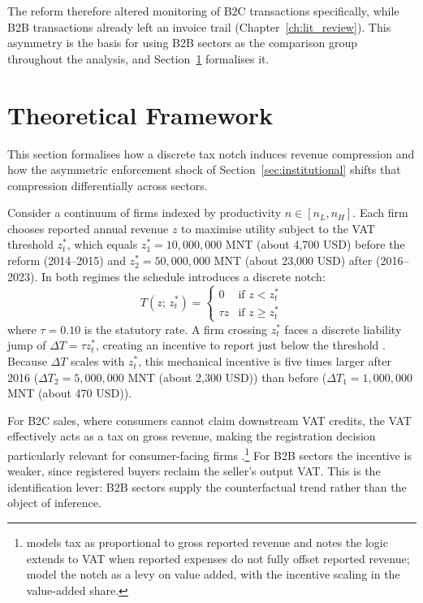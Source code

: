 \documentclass[12pt,oneside,a4paper]{report}
\begin{document}
The reform therefore altered monitoring of B2C transactions specifically, while B2B transactions already left an invoice trail (Chapter~\ref{ch:lit_review}). This asymmetry is the basis for using B2B sectors as the comparison group throughout the analysis, and Section~\ref{sec:theoretical_framework} formalises it.

\section{Theoretical Framework}
\label{sec:theoretical_framework}

This section formalises how a discrete tax notch induces revenue compression and how the asymmetric enforcement shock of Section~\ref{sec:institutional} shifts that compression differentially across sectors.

Consider a continuum of firms indexed by productivity $n \in [n_L, n_H]$. Each firm chooses reported annual revenue $z$ to maximise utility subject to the VAT threshold $z^*_t$, which equals $z_1^* = 10{,}000{,}000$ MNT (about 4,700 USD) before the reform (2014--2015) and $z_2^* = 50{,}000{,}000$ MNT (about 23,000 USD) after (2016--2023). In both regimes the schedule introduces a discrete notch:
\begin{equation}
T(z;\, z^*_t) =
\begin{cases}
0       & \text{if } z < z^*_t \\
\tau z  & \text{if } z \geq z^*_t
\end{cases}
\end{equation}
where $\tau = 0.10$ is the statutory rate. A firm crossing $z^*_t$ faces a discrete liability jump of $\Delta T = \tau z^*_t$, creating an incentive to report just below the threshold \parencite{kleven2013using,kleven2016bunching}. Because $\Delta T$ scales with $z^*_t$, this mechanical incentive is five times larger after 2016 ($\Delta T_2 = 5{,}000{,}000$ MNT (about 2,300 USD)) than before ($\Delta T_1 = 1{,}000{,}000$ MNT (about 470 USD)).

For B2C sales, where consumers cannot claim downstream VAT credits, the VAT effectively acts as a tax on gross revenue, making the registration decision particularly relevant for consumer-facing firms \parencite{liu2021vat}.\footnote{\textcite{naritomi2019consumers} models tax as proportional to gross reported revenue and notes the logic extends to VAT when reported expenses do not fully offset reported revenue; \textcite{harju2019compliance} model the notch as a levy on value added, with the incentive scaling in the value-added share.} For B2B sectors the incentive is weaker, since registered buyers reclaim the seller's output VAT. This is the identification lever: B2B sectors supply the counterfactual trend rather than the object of inference.
\end{document}
